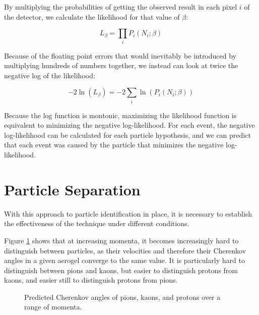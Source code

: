By multiplying the probabilities of getting the observed result in each pixel $i$ of the detector, we calculate the likelihood for that value of $\beta$:

\begin{equation}
L_\beta = \prod_{i}P_i(N_i; \beta)
\end{equation}

Because of the floating point errors that would inevitably be introduced by multiplying hundreds of numbers together, we instead can look at twice the negative log of the likelihood:

\begin{equation}
    \label{eq:log-likelihood}
    -2\ln(L_\beta) = -2\sum_i \ln(P_i(N_i; \beta))
\end{equation}

Because the log function is montonic, maximizing the likelihood function is equivalent to minimizing the negative log-likelihood.
For each event, the negative log-likelihood can be calculated for each particle hypothesis, and we can predict that each event was caused by the particle that minimizes the negative log-likelihood.

\section{Particle Separation}
With this approach to particle identification in place, it is necessary to establish the effectiveness of the technique under different conditions.

Figure \ref{fig:changles} shows that at increasing momenta, it becomes increasingly hard to distinguish between particles, as their velocities and therefore their Cherenkov angles in a given aerogel converge to the same value.
It is particularly hard to distinguish between pions and kaons, but easier to distinguish protons from kaons, and easier still to distinguish protons from pions.

\begin{figure}[]
\centering
{}
\caption[Predicted Cherenkov angles of pions, kaons, and protons over a range of momenta.]{Predicted Cherenkov angles of pions, kaons, and protons over a range of momenta.}
\label{fig:changles}
\end{figure}

